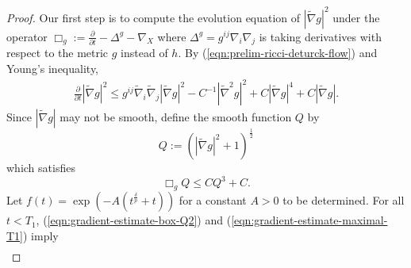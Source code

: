 \documentclass[12pt]{amsart}
\theoremstyle{plain}
\theoremstyle{plain}
\theoremstyle{definition}
\theoremstyle{remark}
\numberwithin{equation}{subsection}
\newcommand{\del}{\nabla}
\newcommand{\hdel}{\tilde{\nabla}}
\begin{document}
\begin{proof}
    Our first step is to compute the evolution equation of $|\hdel g|^2$ under the operator $\Box_g := \frac{\partial}{\partial t} - \Delta^{g} - \nabla_X$ where $\Delta^g = g^{ij}\del_i\del_j$ is taking derivatives with respect to the metric $g$ instead of $h$. By (\ref{eqn:prelim-ricci-deturck-flow}) and Young's inequality, %
    \begin{align}\label{eqn:gradient-estimate-partialt-norm-hdelg}
        \frac{\partial}{\partial t} |\hdel g|^2 \leq g^{ij}\hdel_i\hdel_j|\hdel g|^2 - C^{-1}|\hdel^2 g|^2 + C |\hdel g|^4 + C|\hdel g|.
    \end{align}
    Since $|\hdel g|$ may not be smooth, define the smooth function $Q$ by
    \begin{equation*}
        Q := \left(|\hdel g|^2 + 1\right)^{\frac{1}{2}}
    \end{equation*}
%    
which satisfies
    \begin{equation}\label{eqn:gradient-estimate-box-Q2}
        \Box_g Q \leq C Q^3 + C.
    \end{equation}
    Let $f(t) = \exp\left(-A(t^{\frac{\delta}{p}} +  t)\right)$ for a constant $A > 0$ to be determined. For all $t < T_1$, (\ref{eqn:gradient-estimate-box-Q2}) and (\ref{eqn:gradient-estimate-maximal-T1}) imply %
    \begin{align}\label{eqn:gradient-estimate-box-Q3}

\end{align}
\end{proof}
\end{document}
